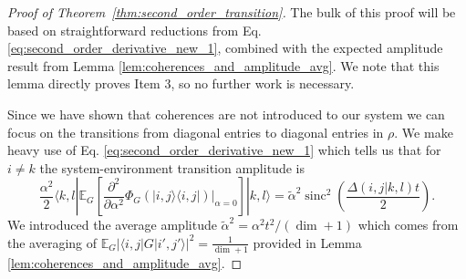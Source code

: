 \documentclass[
 amsmath,amssymb,
 aps,
onecolumn, 
nofootinbib]{revtex4-2}
\newcommand{\ket}[1]{|#1\rangle}
\newcommand{\bra}[1]{\langle #1|}
\newcommand{\ketbra}[2]{| #1\rangle\! \langle #2|}
\newcommand{\abs}[1]{\left| #1 \right|}
\newcommand{\EE}{\mathbb{E}}
\DeclareMathOperator{\sinc}{sinc}
\begin{document}
\begin{proof}[Proof of Theorem~\ref{thm:second_order_transition}]
    The bulk of this proof will be based on straightforward reductions from Eq. \eqref{eq:second_order_derivative_new_1}, combined with the expected amplitude result from Lemma \ref{lem:coherences_and_amplitude_avg}. We note that this lemma directly proves Item 3, so no further work is necessary.
    
    Since we have shown that coherences are not introduced to our system we can focus on the transitions from diagonal entries to diagonal entries in $\rho$. We make heavy use of Eq. \eqref{eq:second_order_derivative_new_1} which tells us that for $i \neq k$ the system-environment transition amplitude is
    \begin{equation}
        \frac{\alpha^2}{2}\bra{k, l} \mathbb{E}_G \left[ \frac{\partial^2}{\partial \alpha^2} \Phi_G(\ketbra{i, j}{i,j}) \big|_{\alpha = 0} \right] \ket{k, l} = \widetilde{\alpha}^2 \sinc^2 \left( \frac{\Delta(i,j | k, l) t}{2} \right). 
    \end{equation}
    We introduced the average amplitude $\widetilde{\alpha}^2 = \alpha^2 t^2 / (\dim + 1)$ which comes from the averaging of $\EE_G \abs{\bra{i,j}G\ket{i',j'}}^2 = \frac{1}{\dim + 1}$ provided in Lemma \ref{lem:coherences_and_amplitude_avg}.
    

\end{proof}
\end{document}
